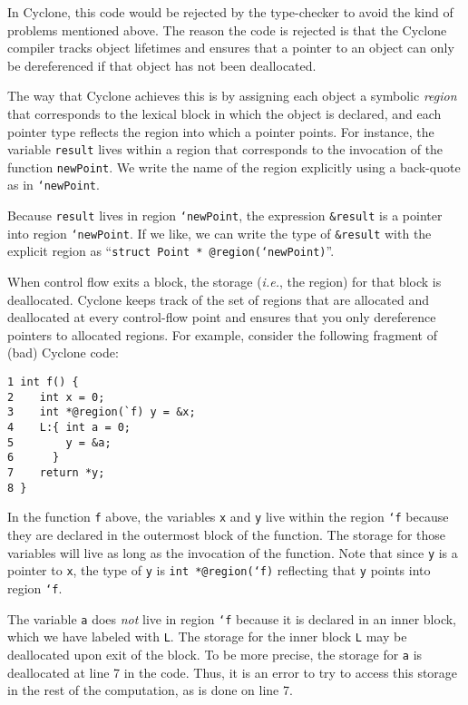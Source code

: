 In Cyclone, this code would be rejected by the type-checker to avoid
the kind of problems mentioned above.  The reason the code is rejected
is that the Cyclone compiler tracks object lifetimes and ensures that
a pointer to an object can only be dereferenced if that object 
has not been deallocated.  

The way that Cyclone achieves this is by assigning each object a
symbolic \emph{region} that corresponds to the lexical block in which
the object is declared, and each pointer type reflects the region
into which a pointer points.  For instance, the variable \texttt{result}
lives within a region that corresponds to the
invocation of the function \texttt{newPoint}.  We write the
name of the region explicitly using a back-quote as in \texttt{`newPoint}.

Because \texttt{result} lives in region \texttt{`newPoint}, the
expression \texttt{\&result} is a pointer into region
\texttt{`newPoint}.  If we like, we can write the type of
\texttt{\&result} with the explicit region as ``\texttt{struct Point *
@region(`newPoint)}''.  

When control flow exits a block, the storage (\emph{i.e.}, 
the region) for that 
block is deallocated.  Cyclone keeps track of the set of regions that
are allocated and deallocated at every control-flow point and ensures
that you only dereference pointers to allocated regions.  For example,
consider the following fragment of (bad) Cyclone code:
\begin{verbatim}
1 int f() {
2    int x = 0;
3    int *@region(`f) y = &x;
4    L:{ int a = 0;
5        y = &a;
6      }
7    return *y;
8 }
\end{verbatim}
In the function \texttt{f} above, the variables \texttt{x} and 
\texttt{y} live within the region \texttt{`f} because they are
declared in the outermost block of the function.  The storage for
those variables will live as long as the invocation of the function.
Note that since \texttt{y} is a pointer to \texttt{x}, the type of
\texttt{y} is \texttt{int *@region(`f)} reflecting that \texttt{y} 
points into region \texttt{`f}.

The variable \texttt{a} does \emph{not} live in region \texttt{`f} because
it is declared in an inner block, which we have labeled with
\texttt{L}.  The storage for the inner block \texttt{L} may be
deallocated upon exit of the block.  To be more precise, the
storage for \texttt{a} is deallocated
at line 7 in the code.  Thus, it is an error to try to access
this storage in the rest of the computation, as is done on line 7.

